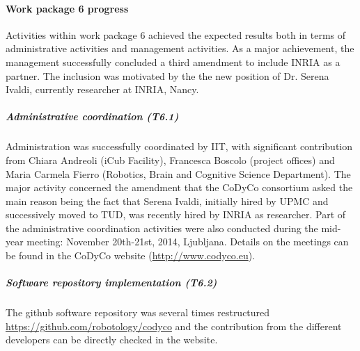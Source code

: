 

\paragraph{Work package 6 progress}

Activities within work package 6 achieved the expected results both in terms of administrative activities and management activities. As a major achievement, the management successfully concluded a third amendment to include INRIA as a partner. The inclusion was motivated by the the new position of Dr. Serena Ivaldi, currently researcher at INRIA, Nancy. 

\subparagraph{Administrative coordination (T6.1)}
Administration was successfully coordinated by IIT, with significant contribution from Chiara Andreoli (iCub Facility), Francesca Boscolo (project offices) and Maria Carmela Fierro (Robotics, Brain and Cognitive Science Department). The major activity concerned the amendment that the CoDyCo consortium asked the main reason being the fact that Serena Ivaldi, initially hired by UPMC and successively moved to TUD, was recently hired by INRIA as researcher. Part of the administrative coordination activities were also conducted during the mid-year meeting: November 20th-21st, 2014, Ljubljana.  Details on the meetings can be found in the CoDyCo website (\url{http://www.codyco.eu}).

\subparagraph{Software repository implementation (T6.2)}

The github software repository was several times restructured \url{https://github.com/robotology/codyco} and the contribution from the different developers can be directly checked in the website. 